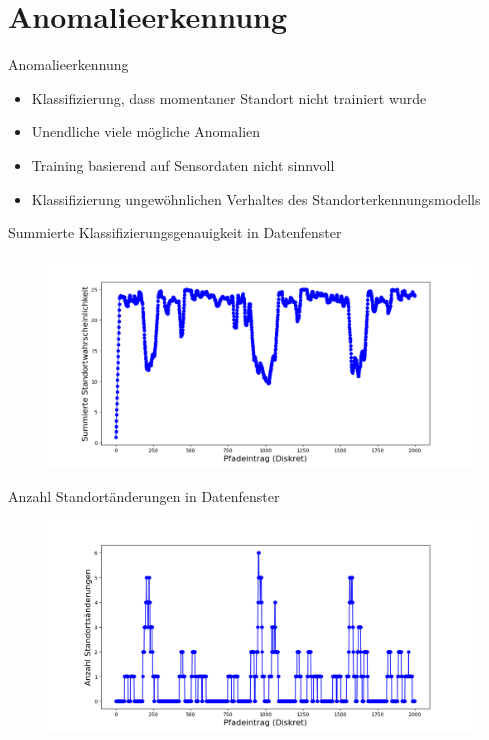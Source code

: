 \documentclass[10pt]{beamer}
\begin{document}
\section{Anomalieerkennung}
\begin{frame}{Anomalieerkennung}
    \begin{itemize}
        \item Klassifizierung, dass momentaner Standort nicht trainiert wurde
        \item Unendliche viele mögliche Anomalien
        \item Training basierend auf Sensordaten nicht sinnvoll
        \item Klassifizierung ungewöhnlichen Verhaltes des Standorterkennungsmodells
    \end{itemize}
\end{frame}

\begin{frame}{Summierte Klassifizierungsgenauigkeit in Datenfenster}
    \begin{figure}
        \centering
        \includegraphics[width=\linewidth]{anomaly_detection/window_conf.png}
    \end{figure}
\end{frame}

\begin{frame}{Anzahl Standortänderungen in Datenfenster}
    \begin{figure}
        \centering
        \includegraphics[width=\linewidth]{anomaly_detection/location_changes.png}
    \end{figure}
\end{frame}
\end{document}
